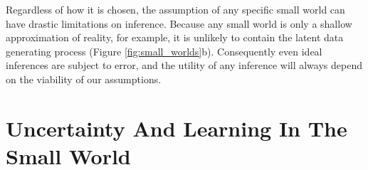Regardless of how it is chosen, the assumption of any specific 
small world can have drastic limitations on inference.  Because any
small world is only a shallow approximation of reality, for example, 
it is unlikely to contain the latent data generating process (Figure
\ref{fig:small_worlds}b).  Consequently even ideal inferences are 
subject to error, and the utility of any inference will always depend 
on the viability of our assumptions.

\begin{figure*}
\centering
%
\caption{Practical inference requires the selection of a distinguished subset 
of data generating processes called a small world, $\Theta$, that (a) may or 
(b) may not contain the latent data generating process, $\PP_{D}$.  The 
Boxian philosophy of ``all models are wrong but some are useful'' asserts 
that the former is impossible in practical problems, but even in the latter
case the probability distributions in the small world may provide useful
approximations of $\PP_{D}$.
}
\label{fig:small_worlds}
\end{figure*}

\section{Uncertainty And Learning In The Small World}

